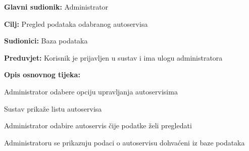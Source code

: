 	\noindent {}
\begin{packed_item}

	\item \textbf{Glavni sudionik: } Administrator
	\item  \textbf{Cilj:} Pregled podataka odabranog autoservisa
	\item  \textbf{Sudionici:} Baza podataka
	\item  \textbf{Preduvjet:} Korisnik je prijavljen u sustav i ima ulogu administratora
	\item  \textbf{Opis osnovnog tijeka:}

	\item[] \begin{packed_enum}

		\item Administrator odabere opciju upravljanja autoservisima
		\item Sustav prikaže listu autoservisa
		\item Administrator odabire autoservis čije podatke želi pregledati
		\item Administratoru se prikazuju podaci o autoservisu dohvaćeni iz baze podataka

	\end{packed_enum}
\end{packed_item}

